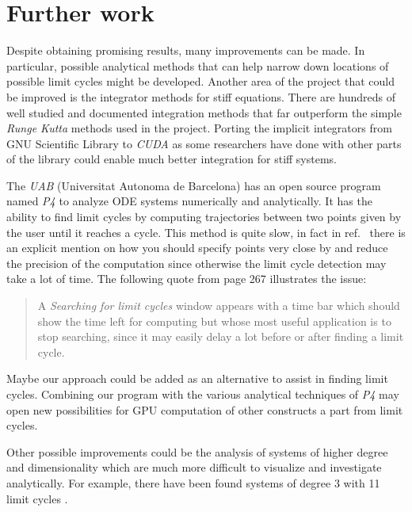 %
\section{Further work}%
\label{sec:future}

Despite obtaining promising results, many improvements can be made. In particular,  possible analytical methods that can help narrow down locations of possible limit cycles might be developed. Another area of the project that could be improved is the integrator methods for stiff equations. There are hundreds of well studied and documented integration methods that far outperform the simple \emph{Runge Kutta} methods used in the project. Porting the implicit integrators from GNU Scientific Library to \emph{CUDA} as some researchers have done with other parts of the library \cite{rodrigo_gnu_2019} could enable much better integration for stiff systems.

The \emph{UAB} (Universitat Autonoma de Barcelona) has an open source program
named \emph{P4} \cite{saleta_oscarsaletap4_2018,saleta_computer_2018} to analyze ODE systems numerically and analytically. It has the ability to find limit cycles by computing trajectories between two points given by the user until it reaches a cycle. This method is quite slow, in fact in ref.~\cite{dumortier_examples_2006} there is an explicit mention on how you should specify points very close by and reduce the precision of the computation since otherwise the limit cycle detection may take a lot of time. The following quote
from page 267 illustrates the issue:

\begin{quote}
A \emph{Searching for limit cycles} window  appears  with  a  time  bar which  should show the time left for computing but whose most useful application is to stop searching, since it may easily delay a lot before or after finding a limit cycle.
\end{quote}

Maybe our approach could be added as an alternative to assist in finding limit cycles. Combining our program with the various analytical techniques of \emph{P4} may open new possibilities for GPU computation of other constructs a part from limit cycles.

Other possible improvements could be the analysis of systems of higher degree
and dimensionality which are much more difficult to visualize and investigate analytically.
For example, there have been found systems of degree 3 with 11 limit cycles \cite{han_lower_2012}.
